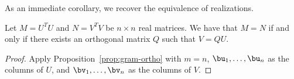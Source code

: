 {As an immediate corollary, we recover the equivalence of realizations.
\begin{corollary}\label{cor:gram-ortho}
Let $M = U^{T} U$ and $N = V^{T} V$ be $n \times n$ real matrices. We have that $M= N$ if and only if there exists an orthogonal matrix $Q$ such that $V = QU$. 
\end{corollary}
\begin{proof}
Apply Proposition~\ref{prop:gram-ortho} with $m = n$, $\bu_1, \hdots, \bu_n$ as the columns of $U$, and $\bv_1, \hdots, \bv_n$ as the columns of $V$.
\end{proof}


}
